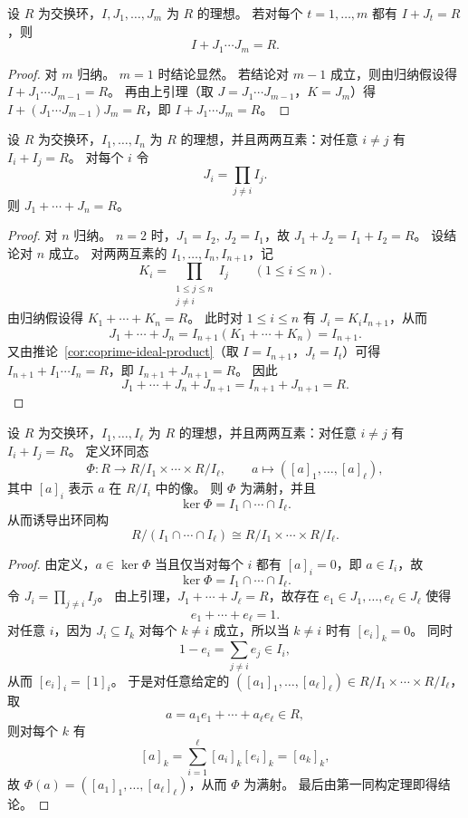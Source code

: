 \documentclass[lang=cn,a4paper,newtx]{elegantbook}
\begin{document}
\begin{corollary}\label{coprime-ideal-product}
  设 $R$ 为交换环，$I,J_1,\dots,J_m$ 为 $R$ 的理想。
  若对每个 $t=1,\dots,m$ 都有 $I+J_t=R$，则
  \[
    I+J_1\cdots J_m=R.
  \]
\end{corollary}

\begin{proof}
  对 $m$ 归纳。
  $m=1$ 时结论显然。
  若结论对 $m-1$ 成立，则由归纳假设得 $I+J_1\cdots J_{m-1}=R$。
  再由上引理（取 $J=J_1\cdots J_{m-1}$，$K=J_m$）得 $I+(J_1\cdots J_{m-1})J_m=R$，即 $I+J_1\cdots J_m=R$。
\end{proof}

\begin{lemma}
  设 $R$ 为交换环，$I_1,\dots,I_n$ 为 $R$ 的理想，并且两两互素：对任意 $i\ne j$ 有 $I_i+I_j=R$。
  对每个 $i$ 令
  \[
    J_i=\prod_{j\ne i} I_j.
  \]
  则 $J_1+\cdots+J_n=R$。
\end{lemma}

\begin{proof}
  对 $n$ 归纳。
  $n=2$ 时，$J_1=I_2,\ J_2=I_1$，故 $J_1+J_2=I_1+I_2=R$。
  设结论对 $n$ 成立。
  对两两互素的 $I_1,\dots,I_n,I_{n+1}$，记
  \[
    K_i=\prod_{\substack{1\le j\le n\\ j\ne i}} I_j\qquad (1\le i\le n).
  \]
  由归纳假设得 $K_1+\cdots+K_n=R$。
  此时对 $1\le i\le n$ 有 $J_i=K_iI_{n+1}$，从而
  \[
    J_1+\cdots+J_n=I_{n+1}(K_1+\cdots+K_n)=I_{n+1}.
  \]
  又由推论~\ref{cor:coprime-ideal-product}（取 $I=I_{n+1}$，$J_t=I_t$）可得 $I_{n+1}+I_1\cdots I_n=R$，即 $I_{n+1}+J_{n+1}=R$。
  因此
  \[
    J_1+\cdots+J_n+J_{n+1}=I_{n+1}+J_{n+1}=R.
  \]
\end{proof}

\begin{theorem}
  设 $R$ 为交换环，$I_1,\dots,I_{\ell}$ 为 $R$ 的理想，并且两两互素：对任意 $i\ne j$ 有 $I_i+I_j=R$。
  定义环同态
  \[
    \Phi:R\to R/I_1\times\cdots\times R/I_{\ell},\qquad
    a\mapsto ([a]_1,\dots,[a]_{\ell}),
  \]
  其中 $[a]_i$ 表示 $a$ 在 $R/I_i$ 中的像。
  则 $\Phi$ 为满射，并且
  \[
    \ker\Phi=I_1\cap\cdots\cap I_{\ell}.
  \]
  从而诱导出环同构
  \[
    R/(I_1\cap\cdots\cap I_{\ell})\cong R/I_1\times\cdots\times R/I_{\ell}.
  \]
\end{theorem}

\begin{proof}
  由定义，$a\in\ker\Phi$ 当且仅当对每个 $i$ 都有 $[a]_i=0$，即 $a\in I_i$，故
  \[
    \ker\Phi=I_1\cap\cdots\cap I_{\ell}.
  \]
  令 $J_i=\prod_{j\ne i} I_j$。
  由上引理，$J_1+\cdots+J_{\ell}=R$，故存在 $e_1\in J_1,\dots,e_{\ell}\in J_{\ell}$ 使得
  \[
    e_1+\cdots+e_{\ell}=1.
  \]
  对任意 $i$，因为 $J_i\subseteq I_k$ 对每个 $k\ne i$ 成立，所以当 $k\ne i$ 时有 $[e_i]_k=0$。
  同时
  \[
    1-e_i=\sum_{j\ne i} e_j\in I_i,
  \]
  从而 $[e_i]_i=[1]_i$。
  于是对任意给定的 $([a_1]_1,\dots,[a_{\ell}]_{\ell})\in R/I_1\times\cdots\times R/I_{\ell}$，取
  \[
    a=a_1e_1+\cdots+a_{\ell}e_{\ell}\in R,
  \]
  则对每个 $k$ 有
  \[
    [a]_k=\sum_{i=1}^{\ell} [a_i]_k[e_i]_k=[a_k]_k,
  \]
  故 $\Phi(a)=([a_1]_1,\dots,[a_{\ell}]_{\ell})$，从而 $\Phi$ 为满射。
  最后由第一同构定理即得结论。
\end{proof}
\end{document}

